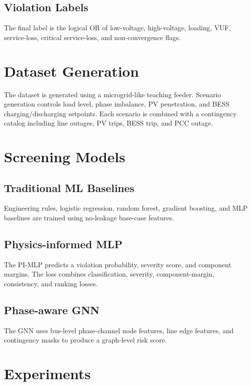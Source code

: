\documentclass[conference]{IEEEtran}
\begin{document}
\subsection{Violation Labels}
The final label is the logical OR of low-voltage, high-voltage, loading, VUF, service-loss, critical service-loss, and non-convergence flags.

\section{Dataset Generation}
The dataset is generated using a microgrid-like teaching feeder. Scenario generation controls load level, phase imbalance, PV penetration, and BESS charging/discharging setpoints. Each scenario is combined with a contingency catalog including line outages, PV trips, BESS trip, and PCC outage.



\section{Screening Models}
\subsection{Traditional ML Baselines}
Engineering rules, logistic regression, random forest, gradient boosting, and MLP baselines are trained using no-leakage base-case features.

\subsection{Physics-informed MLP}
The PI-MLP predicts a violation probability, severity score, and component margins. The loss combines classification, severity, component-margin, consistency, and ranking losses.

\subsection{Phase-aware GNN}
The GNN uses bus-level phase-channel node features, line edge features, and contingency masks to produce a graph-level risk score.

\section{Experiments}



\end{document}
